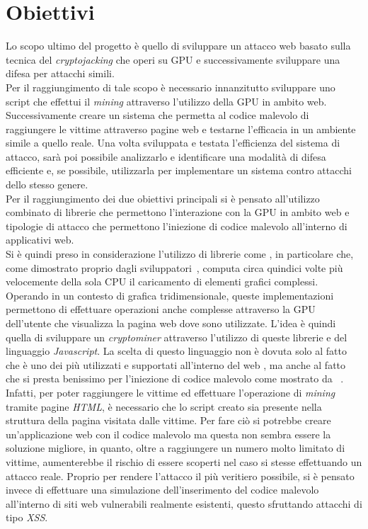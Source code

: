 \documentclass[conference]{IEEEtran}
\newcommand\citen[1]{\citeauthor{#1} \citep{#1}}
\begin{document}
\section{Obiettivi}
Lo scopo ultimo del progetto è quello di sviluppare un attacco web basato sulla tecnica del \emph{cryptojacking} che operi su GPU e successivamente sviluppare una difesa per attacchi simili.\\
Per il raggiungimento di tale scopo è necessario innanzitutto sviluppare uno script che effettui il \emph{mining} attraverso l'utilizzo della GPU in ambito web. Successivamente creare un sistema che permetta al codice malevolo di raggiungere le vittime attraverso pagine web e testarne l'efficacia in un ambiente simile a quello reale. Una volta sviluppata e testata l'efficienza del sistema di attacco, sarà poi possibile analizzarlo e identificare una modalità di difesa efficiente e, se possibile, utilizzarla per implementare un sistema contro attacchi dello stesso genere.\\
Per il raggiungimento dei due obiettivi principali si è pensato all'utilizzo combinato di librerie che permettono l'interazione con la GPU in ambito web e  tipologie di attacco che permettono l'iniezione di codice malevolo all'interno di applicativi web.\\
Si è quindi preso in considerazione l'utilizzo di librerie come , in particolare  che, come dimostrato proprio dagli sviluppatori~\citep{banchmarkGPU.js}, computa circa quindici volte più velocemente della sola CPU il caricamento di elementi grafici complessi. Operando in un contesto di grafica tridimensionale, queste implementazioni permettono di effettuare operazioni anche complesse attraverso la GPU dell'utente che visualizza la pagina web dove sono utilizzate. L'idea è quindi quella di sviluppare un \emph{cryptominer} attraverso l'utilizzo di queste librerie e del linguaggio \emph{Javascript}. La scelta di questo linguaggio non è dovuta solo al fatto che è uno dei più utilizzati e supportati all'interno del web \citep{w3techsJavascriptPopularity}, ma anche al fatto che si presta benissimo per l'iniezione di codice malevolo come mostrato da~\citen{owaspxss}.\\
Infatti, per poter raggiungere le vittime ed effettuare l'operazione di \emph{mining} tramite pagine \emph{HTML}, è necessario che lo script creato sia presente nella struttura della pagina visitata dalle vittime. Per fare ciò si potrebbe creare un'applicazione web con il codice malevolo ma questa non sembra essere la soluzione migliore, in quanto, oltre a raggiungere un numero molto limitato di vittime, aumenterebbe il rischio di essere scoperti nel caso si stesse effettuando un attacco reale. Proprio per rendere l'attacco il più veritiero possibile, si è pensato invece di effettuare una simulazione dell'inserimento del codice malevolo all'interno di siti web vulnerabili realmente esistenti, questo sfruttando attacchi di tipo \emph{XSS}.\\
\end{document}
